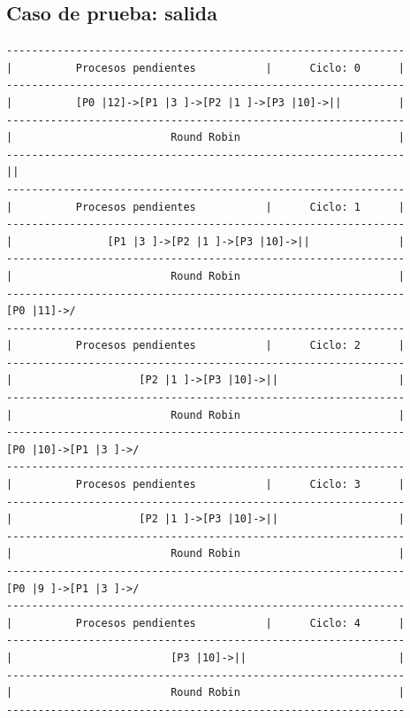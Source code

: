 \documentclass[12pt]{article}
\begin{document}
\subsection{Caso de prueba: salida}
\begin{verbatim}
---------------------------------------------------------------
|          Procesos pendientes           |      Ciclo: 0      |
---------------------------------------------------------------
|          [P0 |12]->[P1 |3 ]->[P2 |1 ]->[P3 |10]->||         |
---------------------------------------------------------------
|                         Round Robin                         |
---------------------------------------------------------------
||
---------------------------------------------------------------
|          Procesos pendientes           |      Ciclo: 1      |
---------------------------------------------------------------
|               [P1 |3 ]->[P2 |1 ]->[P3 |10]->||              |
---------------------------------------------------------------
|                         Round Robin                         |
---------------------------------------------------------------
[P0 |11]->/
---------------------------------------------------------------
|          Procesos pendientes           |      Ciclo: 2      |
---------------------------------------------------------------
|                    [P2 |1 ]->[P3 |10]->||                   |
---------------------------------------------------------------
|                         Round Robin                         |
---------------------------------------------------------------
[P0 |10]->[P1 |3 ]->/
---------------------------------------------------------------
|          Procesos pendientes           |      Ciclo: 3      |
---------------------------------------------------------------
|                    [P2 |1 ]->[P3 |10]->||                   |
---------------------------------------------------------------
|                         Round Robin                         |
---------------------------------------------------------------
[P0 |9 ]->[P1 |3 ]->/
---------------------------------------------------------------
|          Procesos pendientes           |      Ciclo: 4      |
---------------------------------------------------------------
|                         [P3 |10]->||                        |
---------------------------------------------------------------
|                         Round Robin                         |
---------------------------------------------------------------

\end{verbatim}
\end{document}
